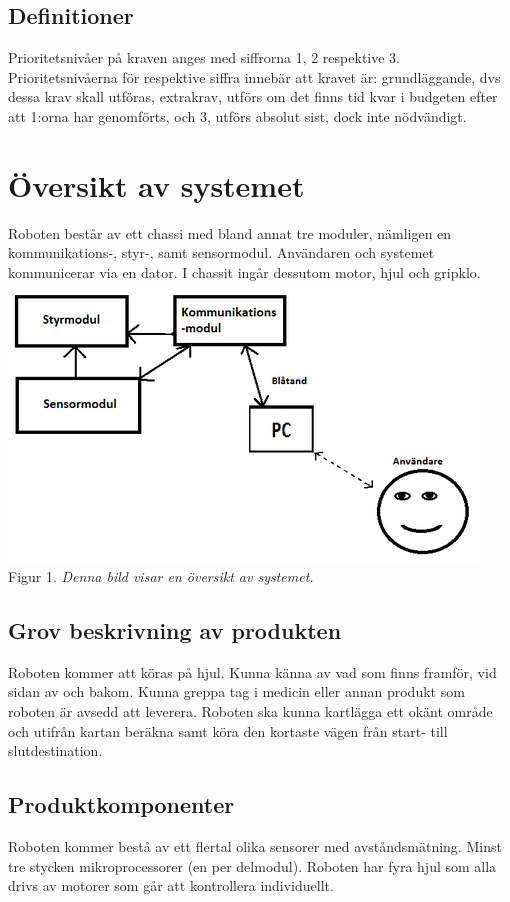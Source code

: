 \documentclass[11pt]{article}
\begin{document}
\begin{flushleft}
\subsection{Definitioner}
Prioritetsnivåer på kraven anges med siffrorna 1, 2 respektive 3. Prioritetsnivåerna för respektive siffra innebär att kravet är: grundläggande, dvs dessa krav skall utföras, extrakrav, utförs om det finns tid kvar i budgeten efter att 1:orna har genomförts, och 3, utförs absolut sist, dock inte nödvändigt.

\pagebreak

\section{Översikt av systemet}
Roboten består av ett chassi med bland annat tre moduler, nämligen en kommunikations-, styr-, samt sensormodul. Användaren och systemet kommunicerar via en dator. I chassit ingår dessutom motor, hjul och gripklo.
\includegraphics{systemskiss}
\\
Figur 1. \textit{Denna bild visar en översikt av systemet.}

\subsection{Grov beskrivning av produkten}
Roboten kommer att köras på hjul. Kunna känna av vad som finns framför, vid sidan av och bakom. Kunna greppa tag i medicin eller annan produkt som roboten är avsedd att leverera. Roboten ska kunna kartlägga ett okänt område och utifrån kartan beräkna samt köra den kortaste vägen från start- till slutdestination. 

\subsection{Produktkomponenter}
Roboten kommer bestå av ett flertal olika sensorer med avståndsmätning. Minst tre stycken mikroprocessorer (en per delmodul). Roboten har fyra hjul som alla drivs av motorer som går att kontrollera individuellt.


\end{flushleft}
\end{document}
